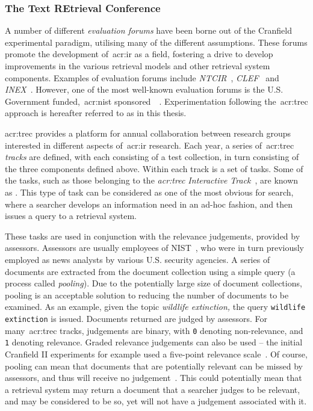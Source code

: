 \subsubsection{The Text REtrieval Conference}\label{sec:ir_background:paradigms:trec}
A number of different \emph{evaluation forums} have been borne out of the Cranfield experimental paradigm, utilising many of the different assumptions. These forums promote the development of~\gls{acr:ir} as a field, fostering a drive to develop improvements in the various retrieval models and other retrieval system components. Examples of evaluation forums include \emph{NTCIR}~\citep{kando1999ntcir}, \emph{CLEF}~\citep{braschler2001clef} and \emph{INEX}~\citep{fuhr2006advances}. However, one of the most well-known evaluation forums is the U.S. Government funded,~\gls{acr:nist} sponsored~~\citep{harman1993trec1}. Experimentation following the~\gls{acr:trec} approach is hereafter referred to as  in this thesis.

\gls{acr:trec} provides a platform for annual collaboration between research groups interested in different aspects of~\gls{acr:ir} research. Each year, a series of~\gls{acr:trec} \emph{tracks} are defined, with each consisting of a test collection, in turn consisting of the three components defined above. Within each track is a set of tasks. Some of the tasks, such as those belonging to the \emph{\gls{acr:trec} Interactive Track}~\citep{over2001trec}, are known as . This type of task can be considered as one of the most obvious for search, where a searcher develops an information need in an ad-hoc fashion, and then issues a query to a retrieval system.

These tasks are used in conjunction with the relevance judgements, provided by assessors. Assessors are usually employees of NIST~\citep{robertson2008history_ir_evaluation}, who were in turn previously employed as news analysts by various U.S. security agencies. A series of documents are extracted from the document collection using a simple query (a process called \emph{pooling}). Due to the potentially large size of document collections, pooling is an acceptable solution to reducing the number of documents to be examined. As an example, given the topic \emph{wildlife extinction,} the query \texttt{wildlife extinction} is issued. Documents returned are judged by assessors. For many~\gls{acr:trec} tracks, judgements are binary, with \texttt{0} denoting non-relevance, and \texttt{1} denoting relevance. Graded relevance judgements can also be used -- the initial Cranfield II experiments for example used a five-point relevance scale~\citep{voorhees2001iir_philosophy}. Of course, pooling can mean that documents that are potentially relevant can be missed by assessors, and thus will receive no judgement~\citep{keenan2001effect}. This could potentially mean that a retrieval system may return a document that a searcher judges to be relevant, and may be considered to be so, yet will not have a judgement associated with it.

